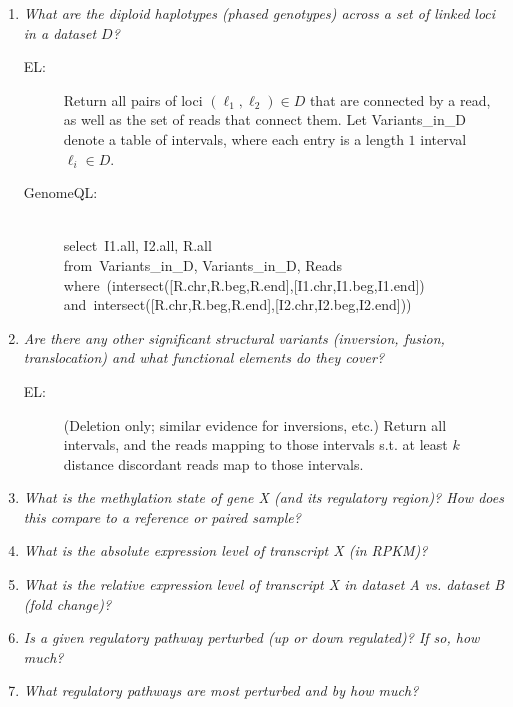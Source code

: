 \documentclass[10pt,fullpage]{article}
\newcommand{\gqlSelect}{{\sc select}}
\newcommand{\gqlFrom}{{\sc from}}
\newcommand{\gqlWhere}{{\sc where}}
\newcommand{\gqlAnd}{{\sc and}}
\newcommand{\gqlIntersects}{{\sc intersect}}
\begin{document}
\begin{minipage}[h]{0.6\linewidth}
\begin{enumerate}
\item \emph{What are the diploid haplotypes (phased genotypes) across
    a set of linked loci in a dataset $D$?}
  \begin{description}
  \item[EL:] Return all pairs of loci $(\ell_1,\ell_2)\in D$ that are
    connected by a read, as well as the set of reads that connect
    them. Let Variants\_in\_D denote a table of intervals, where each
    entry is a length $1$ interval $\ell_i\in D$.
  \item[GenomeQL:] $\:$\\
    \gqlSelect\ I1.all, I2.all, R.all\\
    \gqlFrom\ Variants\_in\_D, Variants\_in\_D, Reads\\
    \gqlWhere\ (\gqlIntersects([R.chr,R.beg,R.end],[I1.chr,I1.beg,I1.end])\\
    \gqlAnd\ \gqlIntersects([R.chr,R.beg,R.end],[I2.chr,I2.beg,I2.end]))\\
  \end{description}
\item\emph{Are there any other significant structural variants
    (inversion, fusion, translocation) and what functional elements do
    they cover?}
  \begin{description}
  \item[EL:] (Deletion only; similar evidence for inversions, etc.)
    Return all intervals, and the reads mapping to those intervals
    s.t. at least $k$ distance discordant reads map to those
    intervals.
  \end{description}



\item \emph{What is the methylation state of gene X (and its regulatory region)?  
How does this compare to a reference or paired sample? }

\item \emph{What is the absolute expression level of transcript X (in RPKM)? }

\item \emph{What is the relative expression level of transcript X in dataset A vs. 
dataset B (fold change)? }

\item \emph{Is a given regulatory pathway perturbed (up or down regulated)?  If so, how 
much? }

\item \emph{What regulatory pathways are most perturbed and by how much? }


\end{enumerate}
\end{minipage}
\end{document}
